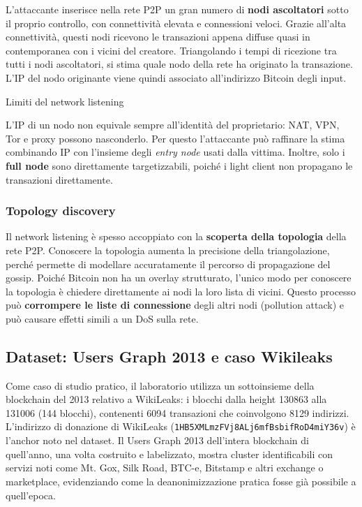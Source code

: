 \documentclass[
  italian,
  openany]{book}
\begin{document}
L'attaccante inserisce nella rete P2P un gran numero di \textbf{nodi
ascoltatori} sotto il proprio controllo, con connettività elevata e
connessioni veloci. Grazie all'alta connettività, questi nodi ricevono
le transazioni appena diffuse quasi in contemporanea con i vicini del
creatore. Triangolando i tempi di ricezione tra tutti i nodi
ascoltatori, si stima quale nodo della rete ha originato la transazione.
L'IP del nodo originante viene quindi associato all'indirizzo Bitcoin
degli input.

\begin{calloutwarning}{Limiti del network listening}

L'IP di un nodo non equivale sempre all'identità del proprietario: NAT,
VPN, Tor e proxy possono nasconderlo. Per questo l'attaccante può
raffinare la stima combinando IP con l'insieme degli \emph{entry node}
usati dalla vittima. Inoltre, solo i \textbf{full node} sono
direttamente targetizzabili, poiché i light client non propagano le
transazioni direttamente.

\end{calloutwarning}

\subsubsection{Topology discovery}\label{topology-discovery}

Il network listening è spesso accoppiato con la \textbf{scoperta della
topologia} della rete P2P. Conoscere la topologia aumenta la precisione
della triangolazione, perché permette di modellare accuratamente il
percorso di propagazione del gossip. Poiché Bitcoin non ha un overlay
strutturato, l'unico modo per conoscere la topologia è chiedere
direttamente ai nodi la loro lista di vicini. Questo processo può
\textbf{corrompere le liste di connessione} degli altri nodi (pollution
attack) e può causare effetti simili a un DoS sulla rete.

\subsection{Dataset: Users Graph 2013 e caso
Wikileaks}\label{dataset-users-graph-2013-e-caso-wikileaks}

Come caso di studio pratico, il laboratorio utilizza un sottoinsieme
della blockchain del 2013 relativo a WikiLeaks: i blocchi dalla height
130863 alla 131006 (144 blocchi), contenenti 6094 transazioni che
coinvolgono 8129 indirizzi. L'indirizzo di donazione di WikiLeaks
(\texttt{1HB5XMLmzFVj8ALj6mfBsbifRoD4miY36v}) è l'anchor noto nel
dataset. Il Users Graph 2013 dell'intera blockchain di quell'anno, una
volta costruito e labelizzato, mostra cluster identificabili con servizi
noti come Mt. Gox, Silk Road, BTC-e, Bitstamp e altri exchange o
marketplace, evidenziando come la deanonimizzazione pratica fosse già
possibile a quell'epoca.
\end{document}
